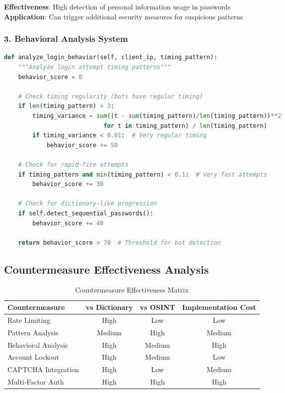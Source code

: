 \documentclass[12pt,a4paper]{article}
\begin{document}
\textbf{Effectiveness}: High detection of personal information usage in passwords\\
\textbf{Application}: Can trigger additional security measures for suspicious patterns

\subsubsection{3. Behavioral Analysis System}

\begin{lstlisting}[language=Python, caption=Behavioral Monitoring]
def analyze_login_behavior(self, client_ip, timing_pattern):
    """Analyze login attempt timing patterns"""
    behavior_score = 0
    
    # Check timing regularity (bots have regular timing)
    if len(timing_pattern) > 3:
        timing_variance = sum((t - sum(timing_pattern)/len(timing_pattern))**2 
                            for t in timing_pattern) / len(timing_pattern)
        if timing_variance < 0.01:  # Very regular timing
            behavior_score += 50
    
    # Check for rapid-fire attempts
    if timing_pattern and min(timing_pattern) < 0.1:  # Very fast attempts
        behavior_score += 30
    
    # Check for dictionary-like progression
    if self.detect_sequential_passwords():
        behavior_score += 40
    
    return behavior_score > 70  # Threshold for bot detection
\end{lstlisting}

\subsection{Countermeasure Effectiveness Analysis}

\begin{table}[H]
\centering
\begin{tabular}{|l|c|c|c|}
\hline
\textbf{Countermeasure} & \textbf{vs Dictionary} & \textbf{vs OSINT} & \textbf{Implementation Cost} \\
\hline
Rate Limiting & High & Low & Low \\
Pattern Analysis & Medium & High & Medium \\
Behavioral Analysis & High & Medium & High \\
Account Lockout & High & Medium & Low \\
CAPTCHA Integration & High & Low & Medium \\
Multi-Factor Auth & High & High & High \\
\hline
\end{tabular}
\caption{Countermeasure Effectiveness Matrix}
\end{table}
\end{document}

